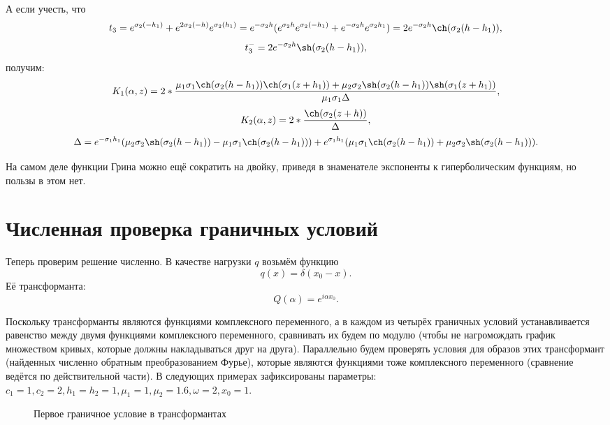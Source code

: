 \documentclass[a4paper, 12pt]{article}
\newcommand{\s}[1]{\sigma_{#1}}
\newcommand{\m}[1]{\mu_{#1}}
\newcommand{\E}[2]{e^{#1 #2}}
\begin{document}
А если учесть, что
$$t_3=\E{\s{2}}{(-h_1)}+ \E{2\s{2}}{(-h)} \E{\s{2}}{(h_1)}=e^{-\s{2}h}(e^{\s{2}h}e^{\s{2}(-h_1)}+e^{-\s{2}h}e^{\s{2}h_1})=2e^{-\s{2}h}\ch(\s{2}(h-h_1)),$$
$$t_3^-=2e^{-\s{2}h}\sh(\s{2}(h-h_1)),$$
получим:
$$K_1(\alpha,z)=2*\frac{\m{1}\s{1}\ch(\s{2}(h-h_1))\ch(\s{1}(z+h_1))+\m{2}\s{2}\sh(\s{2}(h-h_1))\sh(\s{1}(z+h_1))}{\mu_1 \sigma_1 \Delta},$$
$$K_2(\alpha,z)=2*\frac{\ch(\s{2}(z+h))}{\Delta},$$
$$\Delta=\E{-\s{1}}{h_1}(\m{2}\s{2}\sh(\s{2}(h-h_1))-\m{1}\s{1}\ch(\s{2}(h-h_1)))+\E{\s{1}}{h_1}(\m{1}\s{1}\ch(\s{2}(h-h_1))+\m{2}\s{2}\sh(\s{2}(h-h_1))) .$$

На самом деле функции Грина можно ещё сократить на двойку, приведя в знаменателе экспоненты к гиперболическим функциям, но пользы в этом нет.

\section{Численная проверка граничных условий}
Теперь проверим решение численно. В качестве нагрузки $q$ возьмём функцию
\[
q(x) = \delta (x_0-x).
\]
Её трансформанта:
\begin{equation}
  Q(\alpha)= e^{i \alpha x_0}.  
\end{equation}

Поскольку трансформанты являются функциями комплексного переменного, а в каждом из четырёх граничных условий устанавливается равенство между двумя функциями комплексного переменного, сравнивать их будем по модулю (чтобы не нагромождать график множеством кривых, которые должны накладываться друг на друга). Параллельно будем проверять условия для образов этих трансформант (найденных численно обратным преобразованием Фурье), которые являются функциями тоже комплексного переменного (сравнение ведётся по действительной части). В следующих примерах зафиксированы параметры: $c_1=1, c_2=2, h_1=h_2=1, \mu_1=1, \mu_2=1.6, \omega=2, x_0=1$.

\begin{figure}[h!]
\noindent{}
\caption{Первое граничное условие в трансформантах}
\label{figCurves}
\end{figure}
\end{document}
